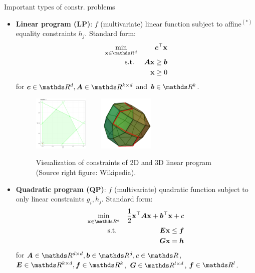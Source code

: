 \documentclass[11pt,compress,t,notes=noshow, xcolor=table]{beamer}
\begin{document}
\begin{vbframe}{Important types of constr. problems}

\vspace*{-0.3cm}

\begin{itemize}
	\item \textbf{Linear program (LP)}: $f$ (multivariate) linear function subject to affine$^{(*)}$ equality constraints $h_j$. Standard form: 
	\vspace*{-0.2cm}
	\begin{eqnarray*}
	\min_{\xv \in \R^d} && \bm{c}^\top\xv\\
	\text{s.t. } && \bm{A}\xv \ge \bm{b} \\
	&& \xv \ge 0
	\end{eqnarray*}
	for $\bm{c}\in \R^d, \bm{A} \in \R^{k \times d}$ and $\bm{b} \in \R^k$. 

	\begin{figure}
		\includegraphics[width=0.25\textwidth]{figure_man/simplex_iter1.png} ~~~ \includegraphics[width=0.25\textwidth]{figure_man/simplex.png} \\
		\begin{footnotesize}
		Visualization of constraints of 2D and 3D linear program (Source right figure: Wikipedia). 
		\end{footnotesize}
	\end{figure}

	\framebreak
	\item \textbf{Quadratic program (QP)}: $f$ (multivariate) quadratic function subject to only linear constraints $g_i, h_j$. Standard form: 
	\vspace*{-0.3cm}
	\begin{eqnarray*}
	\min_{\xv \in \R^d} && \frac{1}{2} \xv^\top \bm{A} \xv + \bm{b}^\top \xv 
	+ c \\
	\text{s.t. } && \bm{E}\xv \le \bm{f} \\
	 && \bm{G}\xv = \bm{h} \\
	\end{eqnarray*}
	for $\bm{A} \in \R^{d \times d}, \bm{b} \in \R^d, c \in \R$, $\bm{E} \in \R^{k \times d}, \bm{f} \in \R^k$, $\bm{G} \in \R^{l \times d}$, $\bm{f} \in \R^l$. 
\end{itemize}


\end{vbframe}
\end{document}
